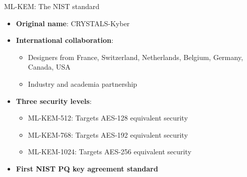 \documentclass[aspectratio=169, lualatex]{beamer} %
\begin{document}
\begin{frame}{ML-KEM: The NIST standard}
	\begin{itemize}
		\item \textbf{Original name}: CRYSTALS-Kyber
		\item \textbf{International collaboration}:
		      \begin{itemize}
			      \item Designers from France, Switzerland, Netherlands, Belgium, Germany, Canada, USA
			      \item Industry and academia partnership
		      \end{itemize}
		\item \textbf{Three security levels}:
		      \begin{itemize}
			      \item ML-KEM-512: Targets AES-128 equivalent security
			      \item ML-KEM-768: Targets AES-192 equivalent security
			      \item ML-KEM-1024: Targets AES-256 equivalent security
		      \end{itemize}
		\item \textbf{First NIST PQ key agreement standard}
	\end{itemize}
\end{frame}
\end{document}
